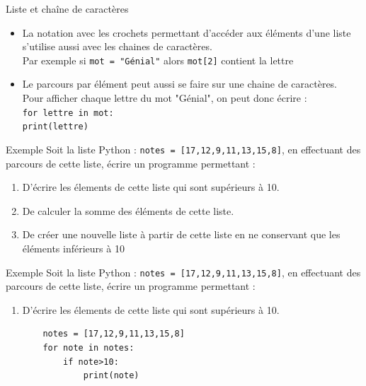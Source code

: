 \documentclass[10pt]{beamer}
\begin{document}
\begin{frame}
	\mframe{\Python}
	\begin{block}{Liste et chaîne de caractères}
		\begin{itemize}
			\item<1-> La notation avec les crochets permettant d'accéder aux éléments d'une liste s'utilise aussi avec les chaines de caractères. \\
			      \onslide<2-> Par exemple si {\tt mot = "Génial"} alors {\tt mot[2]} contient la lettre \onslide<3->{"n"}
			\item<4-> Le parcours par élément peut aussi se faire sur une chaine de caractères. \\
			      \onslide<5-> Pour afficher chaque lettre du mot "Génial", on peut donc écrire : \\
			      \onslide<6-> {\tt for lettre in mot:} \\
			      \onslide<7-> {\tt \qquad    print(lettre)}
		\end{itemize}
	\end{block}
\end{frame}


\begin{frame}
	\mframe{\Python}
	\begin{exampleblock}{Exemple}
		Soit la liste Python : {\tt notes = [17,12,9,11,13,15,8]}, en effectuant des parcours de cette liste, écrire un programme permettant :
		\begin{enumerate}
			\item<1-> D'écrire les élements de cette liste qui sont supérieurs à 10.
			\item<2-> De calculer la somme des éléments de cette liste.
			\item<3-> De créer une nouvelle liste à partir de cette liste en ne conservant que les éléments inférieurs à 10
		\end{enumerate}
	\end{exampleblock}
\end{frame}


\begin{frame}[fragile]
	\mframe{\Python}
	\begin{exampleblock}{Exemple}
		Soit la liste Python : {\tt notes = [17,12,9,11,13,15,8]}, en effectuant des parcours de cette liste, écrire un programme permettant :
		\begin{enumerate}
			\item D'écrire les élements de cette liste qui sont supérieurs à 10.
			      \begin{lstlisting}
	notes = [17,12,9,11,13,15,8]
	for note in notes:
		if note>10:
			print(note)  
\end{lstlisting}
		\end{enumerate}
	\end{exampleblock}
\end{frame}
\end{document}
